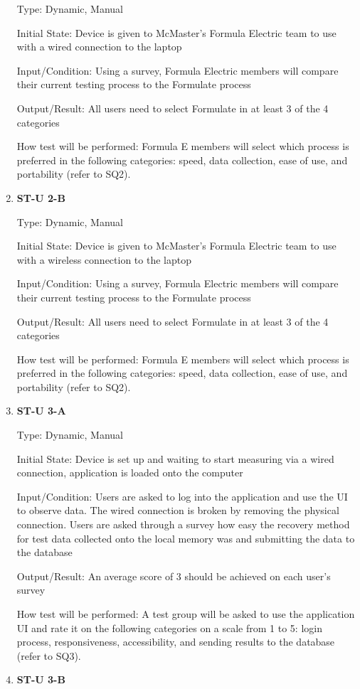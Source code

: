 \documentclass[12pt, titlepage]{article}
\begin{document}
\begin{enumerate}
Type: Dynamic, Manual
					
Initial State: Device is given to McMaster's Formula Electric team to use with a wired connection to the laptop
					
Input/Condition: Using a survey, Formula Electric members will compare their current testing process to the Formulate process
					
Output/Result: All users need to select Formulate in at least 3 of the 4 categories
					
How test will be performed: Formula E members will select which process is preferred in the following categories: speed, data collection, ease of use, and portability (refer to SQ2).
\item{\bf{ST-U 2-B}}

Type: Dynamic, Manual
					
Initial State: Device is given to McMaster's Formula Electric team to use with a wireless connection to the laptop
					
Input/Condition: Using a survey, Formula Electric members will compare their current testing process to the Formulate process
					
Output/Result: All users need to select Formulate in at least 3 of the 4 categories
					
How test will be performed: Formula E members will select which process is preferred in the following categories: speed, data collection, ease of use, and portability (refer to SQ2).
\item{\bf{ST-U 3-A}}

Type: Dynamic, Manual
					
Initial State: Device is set up and waiting to start measuring via a wired connection, application is loaded onto the computer
					
Input/Condition: Users are asked to log into the application and use the UI to observe data. The wired connection is broken by removing the physical connection. Users are asked through a survey how easy the recovery method for test data collected onto the local memory was and submitting the data to the database
					
Output/Result: An average score of 3 should be achieved on each user's survey
					
How test will be performed: A test group will be asked to use the application UI and rate it on the following categories on a scale from 1 to 5: login process, responsiveness, accessibility, and sending results to the database (refer to SQ3).
\item{\bf{ST-U 3-B}}


\end{enumerate}
\end{document}
